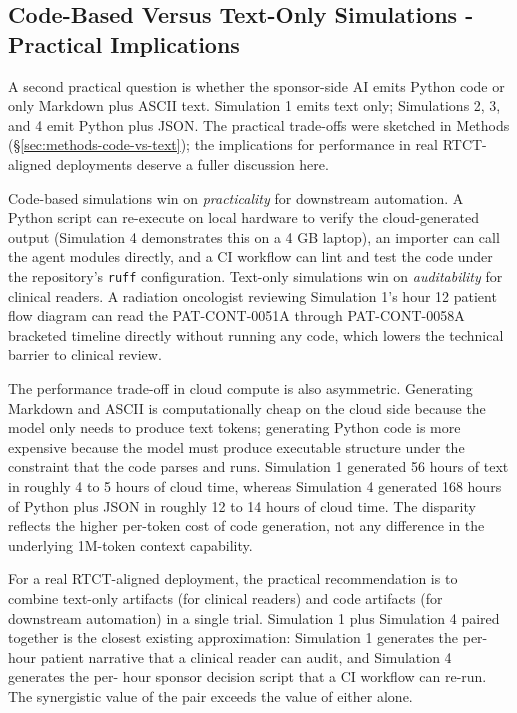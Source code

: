 \subsection{Code-Based Versus Text-Only Simulations - Practical Implications}
\label{sec:disc-code-vs-text}

A second practical question is whether the sponsor-side AI emits
Python code or only Markdown plus ASCII text. Simulation 1 emits
text only; Simulations 2, 3, and 4 emit Python plus JSON. The
practical trade-offs were sketched in Methods
(\S\ref{sec:methods-code-vs-text}); the implications for performance
in real RTCT-aligned deployments deserve a fuller discussion here.

Code-based simulations win on \emph{practicality} for downstream
automation. A Python script can re-execute on local hardware to
verify the cloud-generated output (Simulation 4 demonstrates this on
a 4 GB laptop), an importer can call the agent modules directly, and
a CI workflow can lint and test the code under the repository's
\texttt{ruff} configuration. Text-only simulations win on
\emph{auditability} for clinical readers. A radiation oncologist
reviewing Simulation 1's hour 12 patient flow diagram can read the
PAT-CONT-0051A through PAT-CONT-0058A bracketed timeline directly
without running any code, which lowers the technical barrier to
clinical review.

The performance trade-off in cloud compute is also asymmetric.
Generating Markdown and ASCII is computationally cheap on the cloud
side because the model only needs to produce text tokens; generating
Python code is more expensive because the model must produce
executable structure under the constraint that the code parses and
runs. Simulation 1 generated 56 hours of text in roughly 4 to 5
hours of cloud time, whereas Simulation 4 generated 168 hours of
Python plus JSON in roughly 12 to 14 hours of cloud time. The
disparity reflects the higher per-token cost of code generation, not
any difference in the underlying 1M-token context capability.

For a real RTCT-aligned deployment, the practical recommendation is
to combine text-only artifacts (for clinical readers) and code
artifacts (for downstream automation) in a single trial. Simulation 1
plus Simulation 4 paired together is the closest existing
approximation: Simulation 1 generates the per-hour patient narrative
that a clinical reader can audit, and Simulation 4 generates the per-
hour sponsor decision script that a CI workflow can re-run. The
synergistic value of the pair exceeds the value of either alone.
